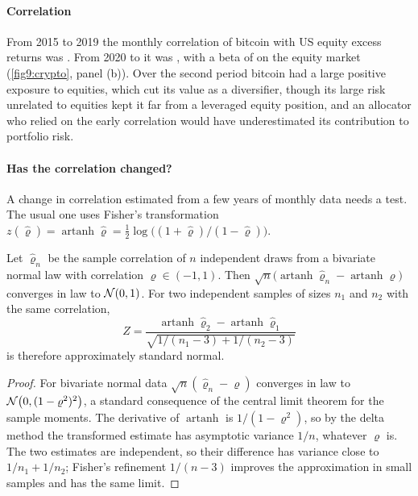 \begin{chapterrefs}
\paragraph{Correlation}
From 2015 to 2019 the monthly correlation of bitcoin with US equity excess returns was \btCorrEarly. From
2020 to \tfLast{} it was \btCorrLate, with a beta of \btBetaLate{} on the equity market
(\cref{fig9:crypto}, panel (b)). Over the second period bitcoin had a large positive exposure to equities,
which cut its value as a diversifier, though its large risk unrelated to equities kept it far from a
leveraged equity position, and an allocator who relied on the early correlation would have
underestimated its contribution to portfolio risk.

\paragraph{Has the correlation changed?}
A change in correlation estimated from a few years of monthly data needs a test. The usual one uses
Fisher's transformation $z(\hat\varrho)=\operatorname{artanh}\hat\varrho=\tfrac12\log\bigl((1+\hat\varrho)/(1-\hat\varrho)\bigr)$.

\begin{proposition}\label{prop9:fisher}
Let $\hat\varrho_n$ be the sample correlation of $n$ independent draws from a bivariate normal law with
correlation $\varrho\in(-1,1)$. Then $\sqrt n\bigl(\operatorname{artanh}\hat\varrho_n-\operatorname{artanh}\varrho\bigr)$ converges
in law to $\mathcal{N}(0,1)$. For two independent samples of sizes $n_1$ and $n_2$ with the same correlation,
\begin{equation}\label{eq9:fisher}
  Z=\frac{\operatorname{artanh}\hat\varrho_2-\operatorname{artanh}\hat\varrho_1}{\sqrt{1/(n_1-3)+1/(n_2-3)}}
\end{equation}
is therefore approximately standard normal.
\end{proposition}

\begin{proof}
For bivariate normal data $\sqrt n(\hat\varrho_n-\varrho)$ converges in law to $\mathcal{N}\bigl(0,(1-\varrho^2)^2\bigr)$, a standard
consequence of the central limit theorem for the sample moments. The derivative of $\operatorname{artanh}$ is
$1/(1-\varrho^2)$, so by the delta method the transformed estimate has asymptotic variance $1/n$, whatever
$\varrho$ is. The two estimates are independent, so their difference has variance close to $1/n_1+1/n_2$;
Fisher's refinement $1/(n-3)$ improves the approximation in small samples and has the same limit.
\end{proof}


\end{chapterrefs}
